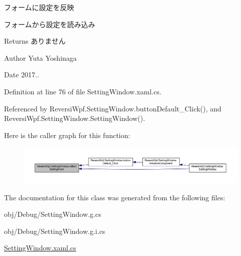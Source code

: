 フォームに設定を反映 

フォームから設定を読み込み

\begin{DoxyReturn}{Returns}
ありません 
\end{DoxyReturn}
\begin{DoxyAuthor}{Author}
Yuta Yoshinaga 
\end{DoxyAuthor}
\begin{DoxyDate}{Date}
2017.. 
\end{DoxyDate}


Definition at line 76 of file Setting\+Window.\+xaml.\+cs.



Referenced by Reversi\+Wpf.\+Setting\+Window.\+button\+Default\+\_\+\+Click(), and Reversi\+Wpf.\+Setting\+Window.\+Setting\+Window().

Here is the caller graph for this function\+:\nopagebreak
\begin{figure}[H]
\begin{center}
\leavevmode
\includegraphics[width=350pt]{class_reversi_wpf_1_1_setting_window_aefc06dfe7cb0574c8a2d81eb343f13ed_icgraph}
\end{center}
\end{figure}


The documentation for this class was generated from the following files\+:\begin{DoxyCompactItemize}
\item 
obj/\+Debug/Setting\+Window.\+g.\+cs\item 
obj/\+Debug/Setting\+Window.\+g.\+i.\+cs\item 
\hyperlink{_setting_window_8xaml_8cs}{Setting\+Window.\+xaml.\+cs}\end{DoxyCompactItemize}
